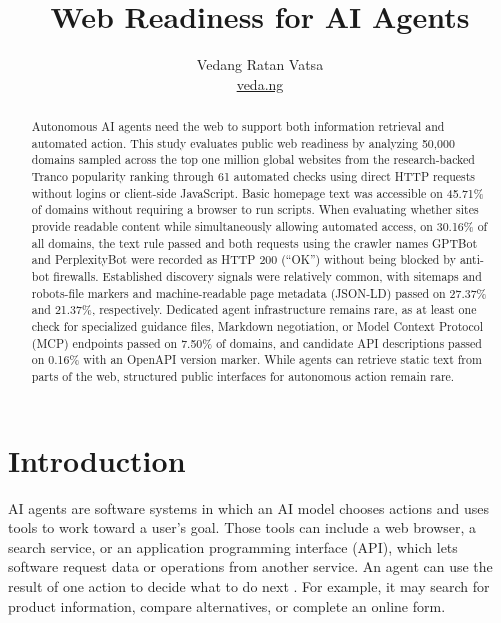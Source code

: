 \documentclass{article}
\title{Web Readiness for AI Agents}
\author{Vedang Ratan Vatsa \\
\href{https://veda.ng}{veda.ng}}
\begin{document}
\raggedbottom

\maketitle

\begin{abstract}
Autonomous AI agents need the web to support both information retrieval and automated action. This study evaluates public web readiness by analyzing 50,000 domains sampled across the top one million global websites from the research-backed Tranco popularity ranking through 61 automated checks using direct HTTP requests without logins or client-side JavaScript. Basic homepage text was accessible on 45.71\% of domains without requiring a browser to run scripts. When evaluating whether sites provide readable content while simultaneously allowing automated access, on 30.16\% of all domains, the text rule passed and both requests using the crawler names GPTBot and PerplexityBot were recorded as HTTP 200 (``OK'') without being blocked by anti-bot firewalls. Established discovery signals were relatively common, with sitemaps and robots-file markers and machine-readable page metadata (JSON-LD) passed on 27.37\% and 21.37\%, respectively. Dedicated agent infrastructure remains rare, as at least one check for specialized guidance files, Markdown negotiation, or Model Context Protocol (MCP) endpoints passed on 7.50\% of domains, and candidate API descriptions passed on 0.16\% with an OpenAPI version marker. While agents can retrieve static text from parts of the web, structured public interfaces for autonomous action remain rare.

\par\medskip
{}

\end{abstract}

\section{Introduction}

AI agents are software systems in which an AI model chooses actions and uses tools to work toward a user's goal. Those tools can include a web browser, a search service, or an application programming interface (API), which lets software request data or operations from another service. An agent can use the result of one action to decide what to do next \cite{ref31}. For example, it may search for product information, compare alternatives, or complete an online form.
\end{document}
